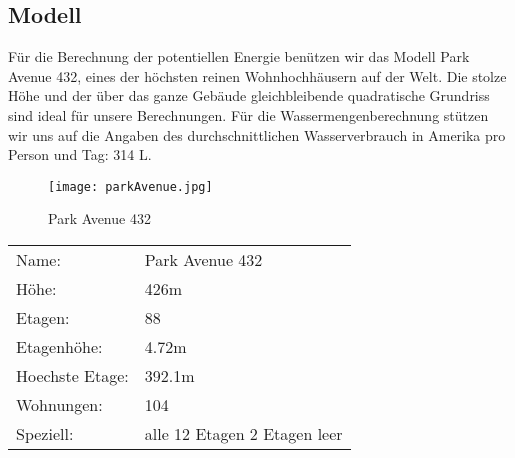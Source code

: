 \subsection{Modell} \label{subsec:modell}

Für die Berechnung der potentiellen Energie benützen wir das Modell Park Avenue 432, eines der höchsten reinen Wohnhochhäusern auf der Welt. Die stolze Höhe und der über das ganze Gebäude gleichbleibende quadratische Grundriss sind ideal für unsere Berechnungen. Für die Wassermengenberechnung stützen wir uns auf die Angaben des durchschnittlichen Wasserverbrauch in Amerika pro Person und Tag: 314 L. \cite{waterUsAmerica}

\begin{figure} [H]
	\centering
	\texttt{[image: parkAvenue.jpg]}
	\caption{Park Avenue 432 \cite{432_Park_Avenue}}
	\label{fig:Park_Avenue_432}
\end{figure}

\begin{table}[H]
\centering
\begin{tabular}{ll}
Name:				& Park Avenue 432\\
Höhe: 				& 426m\\          
Etagen:				& 88\\
Etagenhöhe:			&4.72m\\
Hoechste Etage:		&392.1m\\
Wohnungen:			&104\\
Speziell:			&alle 12 Etagen 2 Etagen leer\\           
\end{tabular}
\end{table}

\newpage
